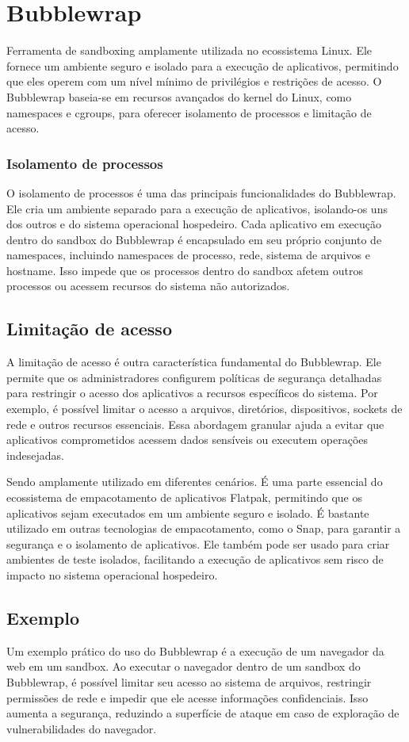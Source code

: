 \section{Bubblewrap}

 Ferramenta de sandboxing amplamente utilizada no ecossistema Linux. Ele fornece um ambiente seguro e isolado para a execução de aplicativos, permitindo que eles operem com um nível mínimo de privilégios e restrições de acesso. O Bubblewrap baseia-se em recursos avançados do kernel do Linux, como namespaces e cgroups, para oferecer isolamento de processos e limitação de acesso.

\subsubsection{Isolamento de processos}
O isolamento de processos é uma das principais funcionalidades do Bubblewrap. Ele cria um ambiente separado para a execução de aplicativos, isolando-os uns dos outros e do sistema operacional hospedeiro. Cada aplicativo em execução dentro do sandbox do Bubblewrap é encapsulado em seu próprio conjunto de namespaces, incluindo namespaces de processo, rede, sistema de arquivos e hostname. Isso impede que os processos dentro do sandbox afetem outros processos ou acessem recursos do sistema não autorizados.


\subsection{Limitação de acesso}
A limitação de acesso é outra característica fundamental do Bubblewrap. Ele permite que os administradores configurem políticas de segurança detalhadas para restringir o acesso dos aplicativos a recursos específicos do sistema. Por exemplo, é possível limitar o acesso a arquivos, diretórios, dispositivos, sockets de rede e outros recursos essenciais. Essa abordagem granular ajuda a evitar que aplicativos comprometidos acessem dados sensíveis ou executem operações indesejadas.

 Sendo amplamente utilizado em diferentes cenários. É uma parte essencial do ecossistema de empacotamento de aplicativos Flatpak, permitindo que os aplicativos sejam executados em um ambiente seguro e isolado. É bastante utilizado em outras tecnologias de empacotamento, como o Snap, para garantir a segurança e o isolamento de aplicativos. Ele também pode ser usado para criar ambientes de teste isolados, facilitando a execução de aplicativos sem risco de impacto no sistema operacional hospedeiro.

\subsection{Exemplo}

Um exemplo prático do uso do Bubblewrap é a execução de um navegador da web em um sandbox. Ao executar o navegador dentro de um sandbox do Bubblewrap, é possível limitar seu acesso ao sistema de arquivos, restringir permissões de rede e impedir que ele acesse informações confidenciais. Isso aumenta a segurança, reduzindo a superfície de ataque em caso de exploração de vulnerabilidades do navegador.